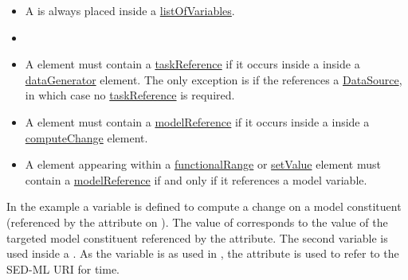 \begin{itemize}
	\item A \Variable is always placed inside a \hyperref[class:listOfVariables]{listOfVariables}.  
	\item {}
	\item A \Variable element must contain a \hyperref[sec:taskReference]{taskReference} if it occurs inside a \hyperref[class:listOfVariables]{} inside a \hyperref[class:dataGenerator]{dataGenerator} element. The only exception is if the \Variable references a \hyperref[class:dataSource]{DataSource}, in which case no \hyperref[sec:taskReference]{taskReference} is required.
	\item A \Variable element must contain a \hyperref[sec:modelReference]{modelReference} if it occurs inside a \hyperref[class:listOfVariables]{} inside a \hyperref[class:computeChange]{computeChange} element.  
	\item A \Variable element appearing within a \hyperref[class:functionalRange]{functionalRange} or \hyperref[class:setValue]{setValue} element must contain a \hyperref[sec:modelReference]{modelReference} if and only if it references a model variable.
\end{itemize}

In the example a variable  is defined to compute a change on a model constituent (referenced by the \hyperref[sec:target]{} attribute on \hyperref[class:computeChange]{}). The value of  corresponds to the value of the targeted model constituent referenced by the  attribute. The second variable  is used inside a \hyperref[class:dataGenerator]{}. As the variable is  as used in , the \hyperref[sec:symbol]{} attribute is used to refer to the SED-ML URI for time.

